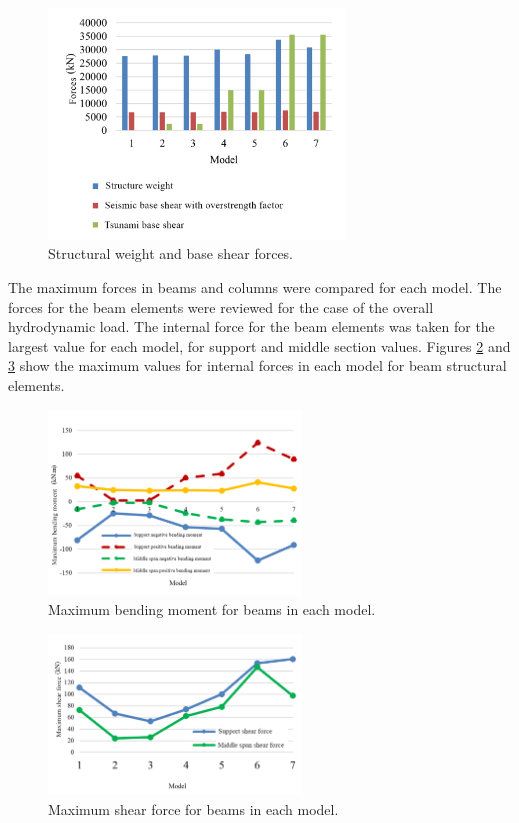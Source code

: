\documentclass{cup-pan}
\begin{document}
\begin{figure}[H]
\centering
\includegraphics[width=0.7\textwidth]{Picture12_engels.png}
\caption{Structural weight and base shear forces.}
\label{fig:base shear}
\end{figure}

The maximum forces in beams and columns were compared for each model. The forces for the beam elements were reviewed for the case of the overall hydrodynamic load. The internal force for the beam elements was taken for the largest value for each model, for support and middle section values. Figures \ref{fig:maxmomentbeam} and \ref{fig:maxshearbeam} show the maximum values for internal forces in each model for beam structural elements.

\begin{figure}[H]
\centering
\includegraphics[width=0.6\textwidth]{Picture13_engels.png}
\caption{Maximum bending moment for beams in each model.}
\label{fig:maxmomentbeam}
\end{figure}

\begin{figure}[H]
\centering
\includegraphics[width=0.6\textwidth]{Picture14_engels.png}
\caption{Maximum shear force for beams in each model.}
\label{fig:maxshearbeam}
\end{figure}
\end{document}
